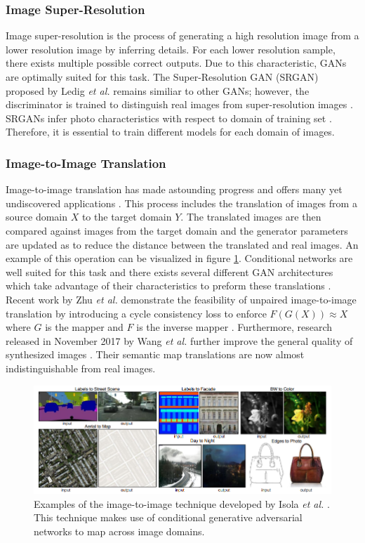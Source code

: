 \documentclass[11pt]{article}
\begin{document}
\subsubsection{Image Super-Resolution}
Image super-resolution is the process of generating a high resolution image from a lower resolution image by inferring details. For each lower resolution sample, there exists multiple possible correct outputs. Due to this characteristic, GANs are optimally suited for this task. The Super-Resolution GAN (SRGAN) proposed by Ledig \textit{et al.} remains similiar to other GANs; however, the discriminator is trained to distinguish real images from super-resolution images \citep{2016arXiv160904802L}. SRGANs infer photo characteristics with respect to domain of training set \citep{2017arXiv171007035C}. Therefore, it is essential to train different models for each domain of images.

\subsubsection{Image-to-Image Translation}
Image-to-image translation has made astounding progress and offers many yet undiscovered applications \citep{2017arXiv170100160G}. This process includes the translation of images from a source domain $X$ to the target domain $Y$. The translated images are then compared against images from the target domain and the generator parameters are updated as to reduce the distance between the translated and real images. An example of this operation can be visualized in figure \ref{fig:img2img}. Conditional networks are well suited for this task and there exists several different GAN architectures which take advantage of their characteristics to preform these translations \citep{2016arXiv161107004I, 2017arXiv171111585W, 2017arXiv170310593Z}. Recent work by Zhu \textit{et al.} demonstrate the feasibility of unpaired image-to-image translation by introducing a cycle consistency loss to enforce $F(G(X)) \approx X$ where $G$ is the mapper and $F$ is the inverse mapper \citep{2017arXiv170310593Z}. Furthermore, research released in November 2017 by Wang \textit{et al.} further improve the general quality of synthesized images \citep{2017arXiv171111585W}. Their semantic map translations are now almost indistinguishable from real images.

\begin{figure}
\centering
\includegraphics[scale=0.55]{img2img}
\caption{Examples of the image-to-image technique developed by Isola \textit{et al.} \citep{2016arXiv161107004I}. This technique makes use of conditional generative adversarial networks to map across image domains.}
\label{fig:img2img}
\end{figure}
\end{document}
